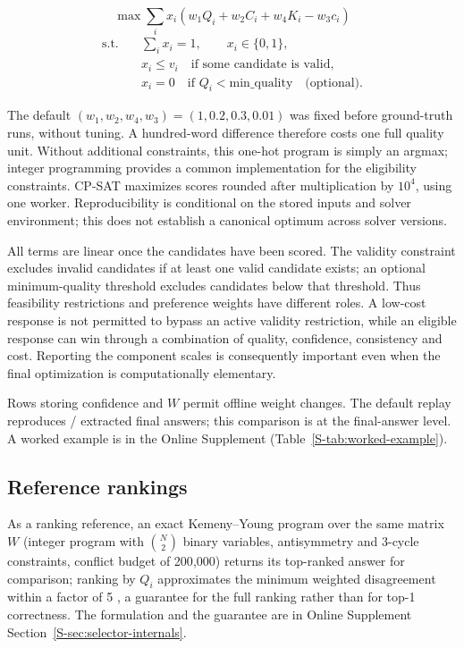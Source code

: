 \documentclass[preprint,11pt,number,sort&compress]{elsarticle}
\begin{document}
\begin{equation}
\max \sum_i x_i\left(w_1Q_i+w_2C_i+w_4K_i-w_3c_i\right)
\label{eq:selection-obj}
\end{equation}
\begin{align}
\text{s.t.}\quad & \sum_i x_i=1,\qquad x_i\in\{0,1\}, \\
& x_i\le v_i\quad\text{if some candidate is valid}, \\
& x_i=0\quad\text{if }Q_i<\text{min\_quality}\quad\text{(optional)}.
\end{align}

The default $(w_1,w_2,w_4,w_3)=(1,0.2,0.3,0.01)$ was fixed before
ground-truth runs, without tuning. A hundred-word difference therefore
costs one full quality unit. Without additional constraints, this
one-hot program is simply an argmax; integer programming provides a common
implementation for the eligibility constraints. CP-SAT \citep{perron2023ortools}
maximizes scores rounded after multiplication by $10^4$, using one worker.
Reproducibility is conditional on the stored inputs and solver environment;
this does not establish a canonical optimum across solver versions.

All terms are linear once the candidates have been scored. The validity
constraint excludes invalid candidates if at least one valid candidate
exists; an optional minimum-quality threshold excludes candidates below
that threshold. Thus feasibility restrictions and preference weights have
different roles. A low-cost response is not permitted to bypass an active
validity restriction, while an eligible response can win through a
combination of quality, confidence, consistency and cost. Reporting the
component scales is consequently important even when the final
optimization is computationally elementary.

Rows storing confidence and $W$ permit offline weight changes. The default
replay reproduces \AblationFidelityK/\AblationFidelityN{} extracted final
answers; this comparison is at the final-answer level. A worked example is
in the Online Supplement (Table~\ref{S-tab:worked-example}).

\subsection{Reference rankings}
\label{sec:kemeny-exact}

As a ranking reference, an exact Kemeny--Young program over the same matrix $W$ (integer program with
$\binom N2$ binary variables, antisymmetry and 3-cycle constraints, conflict budget of 200{,}000) returns
its top-ranked answer for comparison; ranking by $Q_i$ approximates the minimum weighted disagreement
within a factor of 5 \citep{coppersmith2006ordering}, a guarantee for the full ranking rather than for top-1
correctness. The formulation and the guarantee are in Online Supplement Section~\ref{S-sec:selector-internals}.
\end{document}
